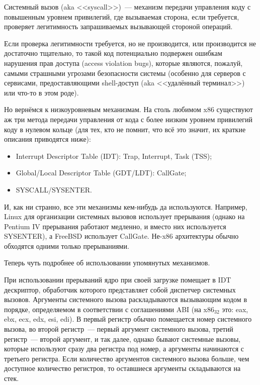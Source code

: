 \begin{definition}
Системный вызов (aka <<syscall>>)~--- механизм передачи управления коду с повышенным уровнем привилегий, где вызываемая сторона, если требуется, проверяет легитимность запрашиваемых вызывающей стороной операций.
\end{definition}

Если проверка легитимности требуется, но не производится, или производится не достаточно тщательно, то такой код потенциально подвержен ошибкам нарушения прав доступа (access violation bugs), которые являются, пожалуй, самыми страшными угрозами безопасности системы (особенно для серверов с сервисами, предоставляющими shell-доступ (aka <<удалённый терминал>>) или что-то в этом роде).

Но вернёмся к низкоуровневым механизмам.
На столь любимом x86 существуют аж три метода передачи управления от кода с более низким уровнем привилегий коду в нулевом кольце (для тех, кто не помнит, что всё это значит, их краткие описания приводятся ниже):
\begin{itemize}
    \item Interrupt Descriptor Table (IDT): Trap, Interrupt, Task (TSS);
    \item Global/Local Descriptor Table (GDT/LDT): CallGate;
    \item SYSCALL/SYSENTER.
\end{itemize}
И, как ни странно, все эти механизмы кем-нибудь да используются.
Например, Linux для организации системных вызовов использует прерывания (однако на Pentium IV прерывания работают медленно, и вместо них используется SYSENTER), а FreeBSD использует CallGate.
Не-x86 архитектуры обычно обходятся одними только прерываниями.

Теперь чуть подробнее об использовании упомянутых механизмов.

При использовании прерываний ядро при своей загрузке помещает в IDT дескриптор, обработчик которого представляет собой диспетчер системных вызовов.
Аргументы системного вызова раскладываются вызывающим кодом в порядке, определяемом в соответствии с соглашениями ABI (на x$86_{32}$ это: eax, ebx, ecx, edx, esi, edi).
В первый регистр обычно помещается номер системного вызова, во второй регистр~--- первый аргумент системного вызова, третий регистр~--- второй аргумент, и так далее, однако бывают системные вызовы, которые используют сразу два регистра под номер, а аргументы начинаются с третьего регистра.
Если количество аргументов системного вызова больше, чем доступное количество регистров, то оставшиеся аргументы складываются на стек.

